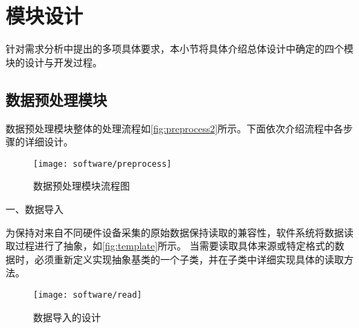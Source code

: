 
\section{模块设计}

针对需求分析中提出的多项具体要求，本小节将具体介绍总体设计中确定的四个模块的设计与开发过程。
\subsection{数据预处理模块}

数据预处理模块整体的处理流程如\autoref{fig:preprocess2}所示。下面依次介绍流程中各步骤的详细设计。
\begin{figure}[htbp]
    \centering
    \texttt{[image: software/preprocess]}
    \caption{\label{fig:preprocess2}数据预处理模块流程图}
\end{figure}

一、数据导入

为保持对来自不同硬件设备采集的原始数据保持读取的兼容性，软件系统将数据读取过程进行了抽象，如\autoref{fig:template}所示。
当需要读取具体来源或特定格式的数据时，必须重新定义实现抽象基类的一个子类，并在子类中详细实现具体的读取方法。

\begin{figure}[htbp]
    \centering
    \texttt{[image: software/read]}
    \caption{\label{fig:template}数据导入的设计}
\end{figure}

